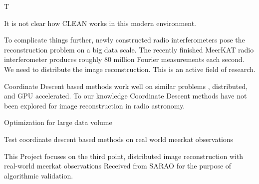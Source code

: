 T

It is not clear how CLEAN works in this modern environment.


To complicate things further, newly constructed radio interferometers pose the reconstruction problem on a big data scale. The recently finished MeerKAT radio interferometer produces roughly 80 million Fourier measurements each second.
We need to distribute the image reconstruction. This is an active field of research.



Coordinate Descent based methods work well on similar problems \cite{nesterov2012efficiency}, distributed\cite{fercoq2014fast}, and GPU accelerated\cite{mcgaffin2015edge}. To our knowledge Coordinate Descent methods have not been explored for image reconstruction in radio astronomy.

Optimization for large data volume\cite{richtarik2016distributed}

Test coordinate descent based methods on real world meerkat observations

This Project focuses on the third point, distributed image reconstruction with real-world meerkat observations
Received from SARAO for the purpose of algorithmic validation.
